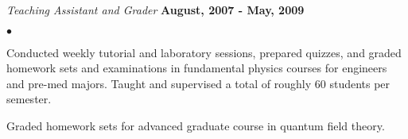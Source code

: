 \documentclass[margin,line]{res}
\newenvironment{list2}{
  \begin{list}{$\bullet$}{%
      \setlength{\itemsep}{0in}
      \setlength{\parsep}{0in} \setlength{\parskip}{0in}
      \setlength{\topsep}{0in} \setlength{\partopsep}{0in} 
      \setlength{\leftmargin}{0.2in}}}{\end{list}}
\begin{document}
\begin{resume}
\vspace*{-0.15in}
{\em Teaching Assistant and Grader} \hfill {\bf August, 2007 - May, 2009}\\
\begin{list2}
\item Conducted weekly tutorial and laboratory sessions, prepared
  quizzes, and graded homework sets and examinations in fundamental
  physics courses for engineers and pre-med majors.  Taught and
  supervised a total of roughly 60 students per semester.
\item Graded homework sets for advanced graduate course in quantum field theory.
\end{list2}



\end{resume}
\end{document}
